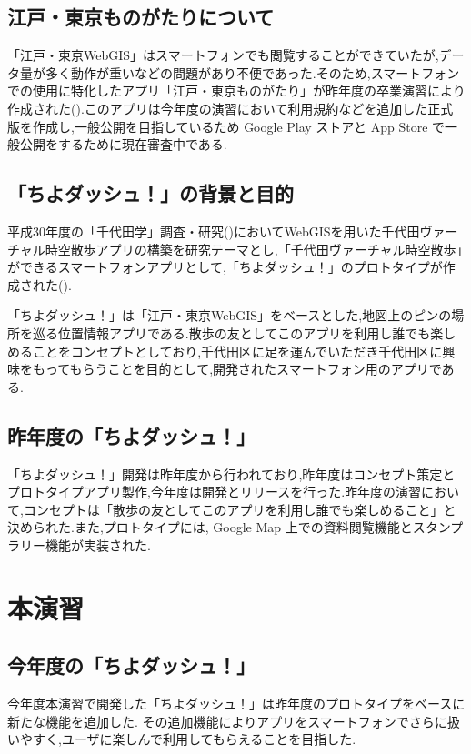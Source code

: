 \documentclass[a4paper, twoside]{jarticle}
\begin{document}
\begin{multicols}{2}
\subsection{江戸・東京ものがたりについて}
「江戸・東京WebGIS」はスマートフォンでも閲覧することができていたが,データ量が多く動作が重いなどの問題があり不便であった.そのため,スマートフォンでの使用に特化したアプリ「江戸・東京ものがたり」が昨年度の卒業演習により作成された(\cite{houkokusyo_30}).このアプリは今年度の演習において利用規約などを追加した正式版を作成し,一般公開を目指しているため Google Play ストアと App Store で一般公開をするために現在審査中である.

\subsection{「ちよダッシュ！」の背景と目的}
平成30年度の「千代田学」調査・研究(\cite{tiyokenkyu})においてWebGISを用いた千代田ヴァーチャル時空散歩アプリの構築を研究テーマとし,「千代田ヴァーチャル時空散歩」ができるスマートフォンアプリとして,「ちよダッシュ！」のプロトタイプが作成された(\cite{tiyodagaku_houkokusyo}).

「ちよダッシュ！」は「江戸・東京WebGIS」をベースとした,地図上のピンの場所を巡る位置情報アプリである.散歩の友としてこのアプリを利用し誰でも楽しめることをコンセプトとしており,千代田区に足を運んでいただき千代田区に興味をもってもらうことを目的として,開発されたスマートフォン用のアプリである.

\subsection{昨年度の「ちよダッシュ！」}
「ちよダッシュ！」開発は昨年度から行われており,昨年度はコンセプト策定とプロトタイプアプリ製作,今年度は開発とリリースを行った.昨年度の演習において,コンセプトは「散歩の友としてこのアプリを利用し誰でも楽しめること」と決められた.また,プロトタイプには, Google Map 上での資料閲覧機能とスタンプラリー機能が実装された.

\section{本演習}

\subsection{今年度の「ちよダッシュ！」}
今年度本演習で開発した「ちよダッシュ！」は昨年度のプロトタイプをベースに新たな機能を追加した.
その追加機能によりアプリをスマートフォンでさらに扱いやすく,ユーザに楽しんで利用してもらえることを目指した.


\end{multicols}
\end{document}
